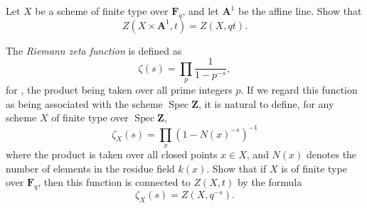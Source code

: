 {{\smallskip
\noindent\hypertarget{ex-C-5.3}{}Let $X$ be a scheme of finite type over $\mathbf F_q$, and let $\mathbf A^1$ be the affine line. Show that
\[
 Z(X\times\mathbf A^1,t)=Z(X,qt).
\]

\noindent\hypertarget{ex-C-5.4}{}The \emph{Riemann zeta function} is defined as
\[
 \zeta(s)=\prod_p\frac{1}{1-p^{-s}},
\]
\noindent for , the product being taken over all prime integers $p$. If we regard this function as being associated with the scheme $\operatorname{Spec}\mathbf Z$, it is natural to define, for any scheme $X$ of finite type over $\operatorname{Spec}\mathbf Z$,
\[
 \zeta_X(s)=\prod_x(1-N(x)^{-s})^{-1}
\]
\noindent where the product is taken over all closed points $x\in X$, and $N(x)$ denotes the number of elements in the residue field $k(x)$.\EditionText{} Show that if $X$ is of finite type over $\mathbf F_q$, then this function is connected to $Z(X,t)$ by the formula
\[
 \zeta_X(s)=Z(X,q^{-s}).
\]
\par}
}
